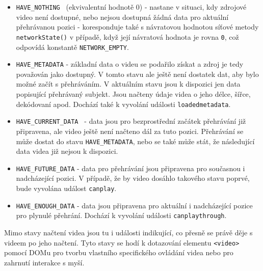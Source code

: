 \begin{itemize}
	\item \texttt{HAVE\_NOTHING } (ekvivalentní hodnotě 0) \newline
	 - nastane v situaci, kdy zdrojové video není dostupné, nebo nejsou dostupná žádná data pro aktuální přehrávanou pozici \newline - koresponduje také s návratovou hodnotou síťové metody \texttt{networkState()} v případě, když její návratová hodnota je rovna \texttt{0}, což odpovídá konstantě \texttt{NETWORK\_EMPTY}.
	
	\item \texttt{HAVE\_METADATA} \newline
		-  základní data o videu se podařilo získat a zdroj je tedy považován jako dostupný. V tomto stavu ale ještě není dostatek dat, aby bylo možné začít s přehráváním. V aktuálním stavu jsou k dispozici jen data popisující přehrávaný subjekt. Jsou načteny údaje videa o jeho délce, šířce, dekódovaní apod. Dochází  také k vyvolání události \texttt{loadedmetadata}.\cite{html5}
	
	\item \texttt{HAVE\_CURRENT\_DATA }\newline
		- data jsou pro bezprostřední začátek přehrávání již  připravena, ale video ještě není načteno dál za tuto pozici. Přehrávání se může  dostat do stavu \texttt{HAVE\_METADATA}, nebo se také může stát, že  následující data videa již nejsou k dispozici.
	
	\item \texttt{HAVE\_FUTURE\_DATA}\newline
		- data pro přehrávání jsou připravena pro současnou i nadcházející pozici. V případě, že by video dosáhlo takového stavu poprvé, bude vyvolána událost \texttt{canplay}.
		
	\item \texttt{HAVE\_ENOUGH\_DATA}\newline
		- data jsou připravena pro aktuální i nadcházející pozice pro plynulé přehrání. Dochází k vyvolání události \texttt{canplaythrough}.
\end{itemize}

Mimo stavy načtení videa jsou tu i události indikující, co přesně se právě děje s videem po jeho načtení. Tyto stavy se hodí k dotazování elementu \texttt{<video>} pomocí DOMu pro tvorbu vlastního specifického ovládání videa nebo pro zahrnutí interakce s myší.



